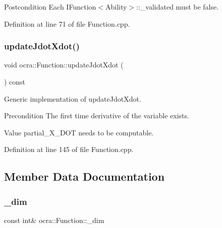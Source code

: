 \begin{DoxyPostcond}{Postcondition}
Each I\+Function$<$\+Ability$>$\+::\+\_\+validated must be false. 
\end{DoxyPostcond}


Definition at line 71 of file Function.\+cpp.

\hypertarget{classocra_1_1Function_a5b3356ce1094f19f4af6e38b319fdfe3}{}\label{classocra_1_1Function_a5b3356ce1094f19f4af6e38b319fdfe3} 
\subsubsection{\texorpdfstring{update\+Jdot\+Xdot()}{updateJdotXdot()}}
{\footnotesize\ttfamily void ocra\+::\+Function\+::update\+Jdot\+Xdot (\begin{DoxyParamCaption}{ }\end{DoxyParamCaption}) const\hspace{0.3cm}{\ttfamily [virtual]}}

Generic implementation of update\+Jdot\+Xdot.

\begin{DoxyPrecond}{Precondition}
The first time derivative of the variable exists. 

Value partial\+\_\+\+X\+\_\+\+D\+OT needs to be computable. 
\end{DoxyPrecond}


Definition at line 145 of file Function.\+cpp.



\subsection{Member Data Documentation}
\hypertarget{classocra_1_1Function_a1b5d0dcebb8b435c7a5e70f8e6fbafcc}{}\label{classocra_1_1Function_a1b5d0dcebb8b435c7a5e70f8e6fbafcc} 
\subsubsection{\texorpdfstring{\+\_\+dim}{\_dim}}
{\footnotesize\ttfamily const int\& ocra\+::\+Function\+::\+\_\+dim\hspace{0.3cm}{\ttfamily [protected]}}



